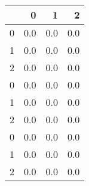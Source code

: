 \begin{tabular}{lrrr}
\toprule
{} &    0 &    1 &    2 \\
\midrule
0 &  0.0 &  0.0 &  0.0 \\
1 &  0.0 &  0.0 &  0.0 \\
2 &  0.0 &  0.0 &  0.0 \\
0 &  0.0 &  0.0 &  0.0 \\
1 &  0.0 &  0.0 &  0.0 \\
2 &  0.0 &  0.0 &  0.0 \\
0 &  0.0 &  0.0 &  0.0 \\
1 &  0.0 &  0.0 &  0.0 \\
2 &  0.0 &  0.0 &  0.0 \\
\bottomrule
\end{tabular}
